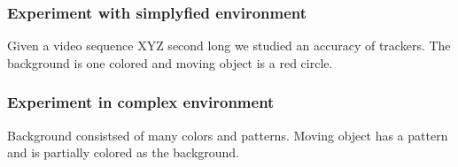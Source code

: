 \subsubsection{Experiment with simplyfied environment}

Given a video sequence XYZ second long we studied an accuracy of trackers. The background is one colored and moving object is a red circle.


\subsubsection{Experiment in complex environment}

Background consistsed of many colors and patterns. Moving object has a pattern and is partially colored as the background.

